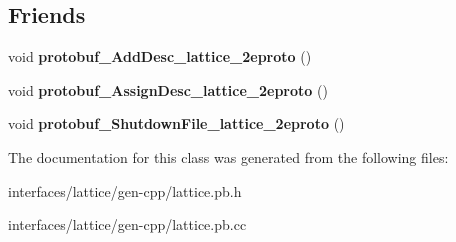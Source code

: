 \subsection*{Friends}
\begin{DoxyCompactItemize}
\item 
\hypertarget{classlattice_1_1Phraselet_a19e63fb37025879e023cad88064187cf}{
void {\bfseries protobuf\_\-AddDesc\_\-lattice\_\-2eproto} ()}
\label{classlattice_1_1Phraselet_a19e63fb37025879e023cad88064187cf}

\item 
\hypertarget{classlattice_1_1Phraselet_a3b0386e09a9fefcf1bdce658cfc480b2}{
void {\bfseries protobuf\_\-AssignDesc\_\-lattice\_\-2eproto} ()}
\label{classlattice_1_1Phraselet_a3b0386e09a9fefcf1bdce658cfc480b2}

\item 
\hypertarget{classlattice_1_1Phraselet_a3c7b187721d0704ceb19ff889729d35a}{
void {\bfseries protobuf\_\-ShutdownFile\_\-lattice\_\-2eproto} ()}
\label{classlattice_1_1Phraselet_a3c7b187721d0704ceb19ff889729d35a}

\end{DoxyCompactItemize}


The documentation for this class was generated from the following files:\begin{DoxyCompactItemize}
\item 
interfaces/lattice/gen-\/cpp/lattice.pb.h\item 
interfaces/lattice/gen-\/cpp/lattice.pb.cc\end{DoxyCompactItemize}
